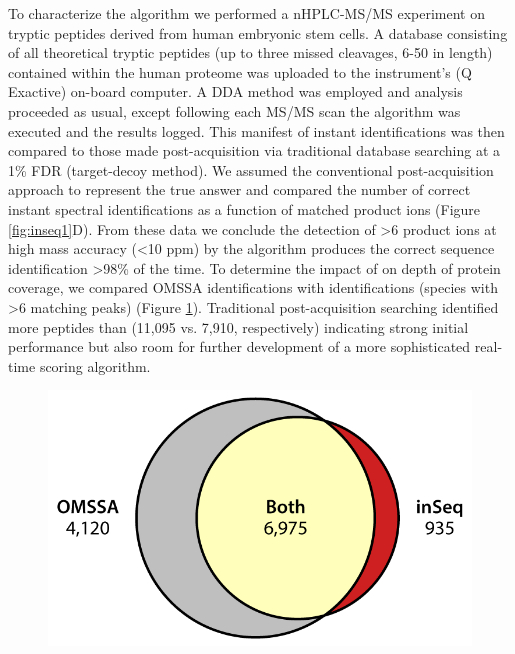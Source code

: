 To characterize the \inseq{} algorithm we performed a nHPLC-MS/MS experiment on tryptic peptides derived from human embryonic stem cells. A database consisting of all theoretical tryptic peptides (up to three missed cleavages, 6-50 in length) contained within the human proteome was uploaded to the instrument's (Q Exactive) on-board computer. A DDA method was employed and analysis proceeded as usual, except following each MS/MS scan the \inseq{} algorithm was executed and the results logged. This manifest of instant identifications was then compared to those made post-acquisition via traditional database searching at a 1\% FDR (target-decoy method). We assumed the conventional post-acquisition approach to represent the true answer and compared the number of correct instant spectral identifications as a function of matched product ions (Figure \ref{fig:inseq1}D). From these data we conclude the detection of >6 product ions at high mass accuracy (<10 ppm) by the \inseq{} algorithm produces the correct sequence identification >98\% of the time. To determine the impact of \inseq{} on depth of protein coverage, we compared OMSSA identifications with \inseq{} identifications (species with >6 matching peaks) (Figure \ref{fig:inseqs3}). Traditional post-acquisition searching identified more peptides than \inseq{} (11,095 vs. 7,910, respectively) indicating strong initial performance but also room for further development of a more sophisticated real-time scoring algorithm.
\begin{figure}
	\centering
	\includegraphics[width=\columnwidth]{inseq/inSeq_Fig S3.png}
	\label{fig:inseqs3}
\end{figure}

